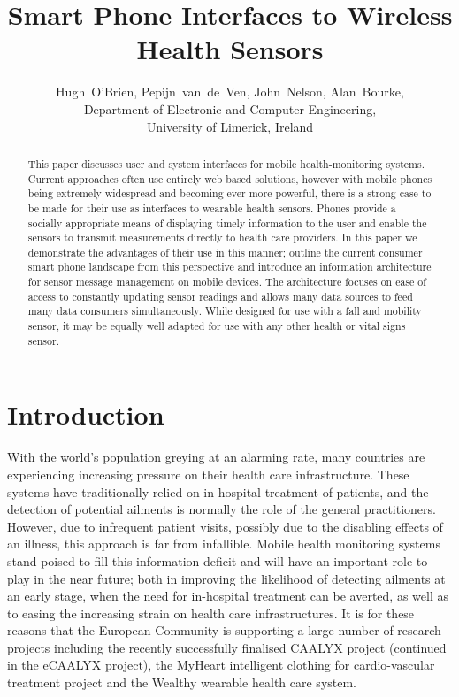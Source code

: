 \documentclass[conference,a4paper]{IEEEtran}
\begin{document}
\title{Smart Phone Interfaces to Wireless Health Sensors}
\author{Hugh~O'Brien, Pepijn~van~de~Ven, John~Nelson, Alan~Bourke,
\\
Department of Electronic and Computer Engineering,
\\
University of Limerick, Ireland}

\maketitle

\begin{abstract}
This paper discusses user and system interfaces for mobile health-monitoring systems.
Current approaches often use entirely web based solutions, however with mobile phones
being extremely widespread and becoming ever more powerful, there is
a strong case to be made for their use as interfaces to wearable health sensors. Phones provide a socially appropriate means of displaying timely information to the
user and enable the sensors to transmit measurements directly to health care providers.
In this paper we demonstrate the advantages of their use in this manner; outline the current consumer smart phone landscape from this perspective and introduce an information architecture for sensor message management on mobile devices. The
architecture focuses on ease of access to constantly updating sensor readings and allows many data sources to feed many data consumers simultaneously. While designed for use with a fall and mobility sensor, it may be equally well adapted for use with any other
health or vital signs sensor. 
\end{abstract}


\section{Introduction}
With the world's population greying at an alarming rate,
many countries are experiencing increasing pressure on their health care infrastructure. These systems have traditionally relied on in-hospital treatment of patients, and the detection of potential ailments is normally the role of the general practitioners. However, due to infrequent patient visits, possibly due to the disabling effects of an illness, this approach is far from infallible. Mobile health monitoring systems stand poised to fill this information deficit and will have an important role to play in the near future; both in improving the likelihood of detecting ailments at an early stage, when the need for in-hospital treatment can be averted, as well as to easing the increasing strain on health care infrastructures. It is for these reasons that the European Community is supporting a large number of research projects including the recently successfully finalised CAALYX project \cite{BourkeCan1} (continued in the eCAALYX project), the MyHeart intelligent clothing for cardio-vascular treatment project and the Wealthy wearable health care system.
\end{document}

